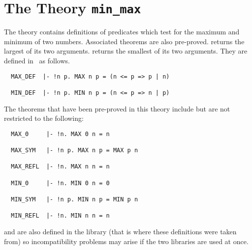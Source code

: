 \section{The Theory {\tt min\_max}}

The theory  contains
definitions of predicates which test for the maximum and minimum of two
numbers. Associated theorems are also pre-proved. 
 returns the largest of its two arguments.
 returns the smallest of its two arguments.
They are defined in \HOL\ as follows.

\begin{hol}
\begin{verbatim}
  MAX_DEF  |- !n p. MAX n p = (n <= p => p | n)

  MIN_DEF  |- !n p. MIN n p = (n <= p => n | p)
\end{verbatim}\end{hol}


The theorems that have been pre-proved in this theory include but are not
restricted to the following:

\begin{hol}
\begin{verbatim}
  MAX_0     |- !n. MAX 0 n = n

  MAX_SYM   |- !n p. MAX n p = MAX p n

  MAX_REFL  |- !n. MAX n n = n

  MIN_0     |- !n. MIN 0 n = 0

  MIN_SYM   |- !n p. MIN n p = MIN p n

  MIN_REFL  |- !n. MIN n n = n
\end{verbatim}\end{hol}

\noindent {} and  are also defined in the  library
(that is where these definitions were taken from) so incompatibility problems
may arise if the two libraries are used at once. 

